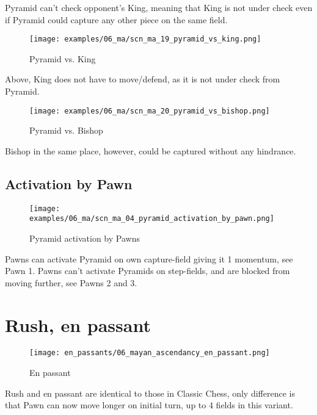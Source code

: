 Pyramid can't check opponent's King, meaning that King is not under check even if
Pyramid could capture any other piece on the same field.

\noindent
\begin{figure}[!h]
\texttt{[image: examples/06\_ma/scn\_ma\_19\_pyramid\_vs\_king.png]}
\caption{Pyramid vs. King}
\label{fig:scn_ma_19_pyramid_vs_king}
\end{figure}

Above, King does not have to move/defend, as it is not under check from Pyramid.

\noindent
\begin{figure}[!h]
\texttt{[image: examples/06\_ma/scn\_ma\_20\_pyramid\_vs\_bishop.png]}
\caption{Pyramid vs. Bishop}
\label{fig:scn_ma_20_pyramid_vs_bishop}
\end{figure}

Bishop in the same place, however, could be captured without any hindrance.

\clearpage %

\subsection*{Activation by Pawn}

\noindent
\begin{figure}[!h]
\texttt{[image: examples/06\_ma/scn\_ma\_04\_pyramid\_activation\_by\_pawn.png]}
\caption{Pyramid activation by Pawns}
\label{fig:scn_ma_04_pyramid_activation_by_pawn}
\end{figure}

Pawns can activate Pyramid on own capture-field giving it 1 momentum, see Pawn 1.
Pawns can't activate Pyramids on step-fields, and are blocked from moving further,
see Pawns 2 and 3.

\clearpage %

\section*{Rush, en passant}

\noindent
\begin{wrapfigure}{l}{0.4\textwidth}
\centering
\texttt{[image: en\_passants/06\_mayan\_ascendancy\_en\_passant.png]}
\caption{En passant}
\label{fig:06_mayan_ascendancy_en_passant}
\end{wrapfigure}
Rush and en passant are identical to those in Classic Chess, only difference
is that Pawn can now move longer on initial turn, up to 4 fields in this
variant.

